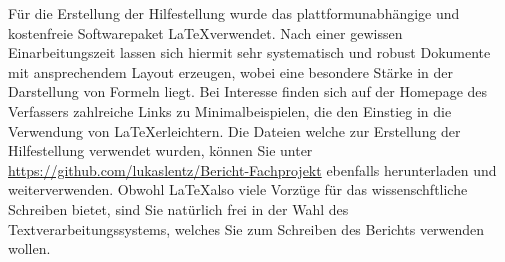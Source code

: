\par
Für die Erstellung der Hilfestellung wurde das  plattformunabhängige und kostenfreie Softwarepaket \LaTeX verwendet.
Nach einer gewissen Einarbeitungszeit lassen sich hiermit sehr systematisch und robust Dokumente mit ansprechendem Layout erzeugen, wobei eine besondere Stärke in der Darstellung von Formeln liegt.
Bei Interesse finden sich auf der Homepage des Verfassers zahlreiche Links zu Minimalbeispielen, die den Einstieg in die Verwendung von \LaTeX erleichtern.
Die Dateien welche zur Erstellung der Hilfestellung verwendet wurden, können Sie unter \url{https://github.com/lukaslentz/Bericht-Fachprojekt} ebenfalls herunterladen und weiterverwenden.
Obwohl \LaTeX also viele Vorzüge für das wissenschftliche Schreiben bietet, sind Sie natürlich frei in der Wahl des Textverarbeitungssystems, welches Sie zum Schreiben des Berichts verwenden wollen. 
%
